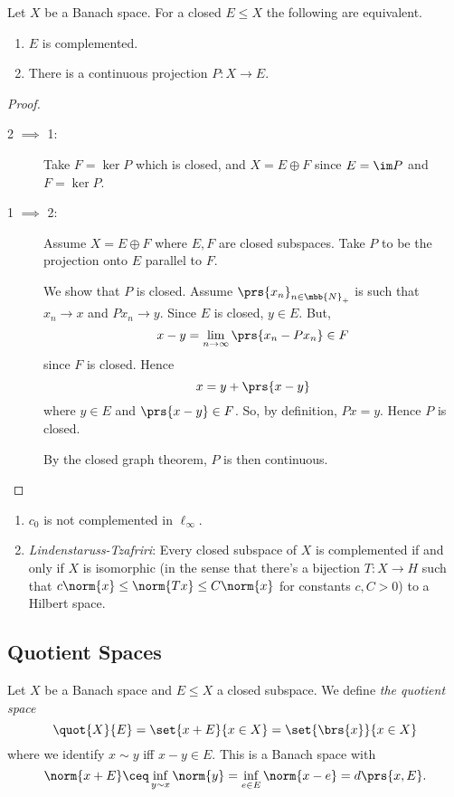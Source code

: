 \documentclass[10pt, twoside]{book}
\begin{document}
\begin{theorem}
Let $X$ be a Banach space.
For a closed $E \leq X$ the following are equivalent.
\begin{enumerate}
\item $E$ is complemented.
\item There is a continuous projection $P \colon X \to E$.
\end{enumerate}
\end{theorem}

\begin{proof}
\begin{description}
\item[2 $\implies$ 1:]
Take $F = \ker P$ which is closed, and $X = E \oplus F$ since $E = \im P$ and $F = \ker P$.
\item[1 $\implies$ 2:]
Assume $X = E \oplus F$ where $E,F$ are closed subspaces. Take $P$ to be the projection onto $E$ parallel to $F$.

We show that $P$ is closed. Assume $\prs{x_n}_{n \in \mbb{N}_+}$ is such that $x_n \to x$ and $P x_n \to y$. Since $E$ is closed, $y \in E$. But,
\[x-y = \lim_{n\to\infty} \prs{x_n - P x_n} \in F\]
since $F$ is closed.
Hence
\[x = y + \prs{x-y}\]
where $y \in E$ and $\prs{x-y} \in F$.
So, by definition, $Px = y$.
Hence $P$ is closed.

By the closed graph theorem, $P$ is then continuous.
\end{description}
\end{proof}

\begin{fact}
\begin{enumerate}
\item $c_0$ is not complemented in $\ell_\infty$.
\item \emph{Lindenstaruss-Tzafriri}: Every closed subspace of $X$ is complemented if and only if $X$ is isomorphic (in the sense that there's a bijection $T \colon X \to H$ such that $c\norm{x} \leq \norm{Tx} \leq C\norm{x}$ for constants $c,C > 0$) to a Hilbert space.
\end{enumerate}
\end{fact}

\subsection{Quotient Spaces}

\begin{definition}
Let $X$ be a Banach space and $E \leq X$ a closed subspace. We define \emph{the quotient space}
\[\quot{X}{E} = \set{x + E}{x \in X} = \set{\brs{x}}{x \in X}\]
where we identify $x \sim y$ iff $x-y \in E$.
This is a Banach space with
\[\norm{x + E} \ceq \inf_{y \sim x} \norm{y} = \inf_{e \in E} \norm{x-e} = d\prs{x,E} \text{.}\]
\end{definition}
\end{document}
